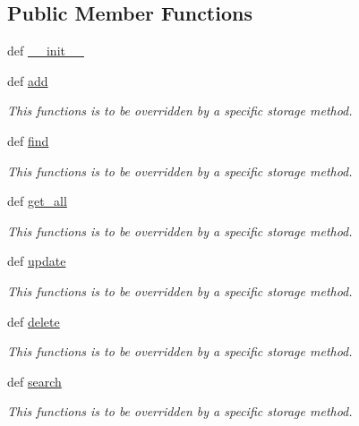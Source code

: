 \subsection*{\-Public \-Member \-Functions}
\begin{DoxyCompactItemize}
\item 
def \hyperlink{classstorage_1_1Storage_af32106831c466787182a5363c139c849}{\-\_\-\-\_\-init\-\_\-\-\_\-}
\item 
def \hyperlink{classstorage_1_1Storage_abff2cc4bca8fd82e1eca9262ac6013d0}{add}
\begin{DoxyCompactList}\small\item\em \-This functions is to be overridden by a specific storage method. \end{DoxyCompactList}\item 
def \hyperlink{classstorage_1_1Storage_ad6eb351cfbfcc4c9dea150ce21dadcd7}{find}
\begin{DoxyCompactList}\small\item\em \-This functions is to be overridden by a specific storage method. \end{DoxyCompactList}\item 
def \hyperlink{classstorage_1_1Storage_a955f60e4ddfdfa4fae84d7b6b8aad438}{get\-\_\-all}
\begin{DoxyCompactList}\small\item\em \-This functions is to be overridden by a specific storage method. \end{DoxyCompactList}\item 
def \hyperlink{classstorage_1_1Storage_ae0ed2cc07e30a6f350a750c7428061e9}{update}
\begin{DoxyCompactList}\small\item\em \-This functions is to be overridden by a specific storage method. \end{DoxyCompactList}\item 
def \hyperlink{classstorage_1_1Storage_ab2da63e5da388a071b1a8ceccd777194}{delete}
\begin{DoxyCompactList}\small\item\em \-This functions is to be overridden by a specific storage method. \end{DoxyCompactList}\item 
def \hyperlink{classstorage_1_1Storage_a393a72aca9a927cab5ac0a4b99d97ebb}{search}
\begin{DoxyCompactList}\small\item\em \-This functions is to be overridden by a specific storage method. \end{DoxyCompactList}\end{DoxyCompactItemize}


